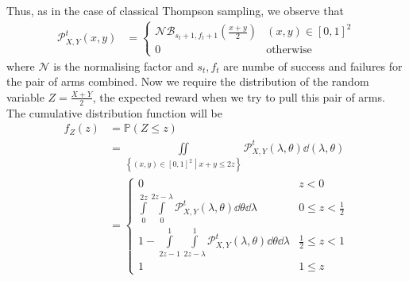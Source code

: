 Thus, as in the case of classical Thompson sampling, we observe that
\begin{align*}
    \mathcal{P}_{X,Y}^t(x,y) &= \begin{cases}
        \mathcal{N}\mathcal{B}_{s_t+1,f_t+1}\left(\tfrac{x+y}{2}\right) & (x,y)\in[0,1]^2 \\
        0 & \text{otherwise}
    \end{cases}
\end{align*}
where $\mathcal{N}$ is the normalising factor and $s_t,f_t$ are numbe of success and failures for the pair of arms combined. Now we require the distribution of the random variable $Z=\tfrac{X+Y}{2}$, the expected reward when we try to pull this pair of arms. The cumulative distribution function will be
\begin{align*}
    f_Z(z) &= \mathbb{P}(Z \leq z) \\
    &= \iint\limits_{\left\{(x,y)\in[0,1]^2\middle|x+y\leq 2z\right\}}\mathcal{P}_{X,Y}^t(\lambda,\theta)\dd(\lambda,\theta) \\
    &= \begin{cases}
        0 & z < 0 \\
        \int\limits_0^{2z}\int\limits_0^{2z - \lambda}\mathcal{P}_{X,Y}^t(\lambda,\theta)\dd\theta\dd\lambda & 0 \leq z < \tfrac{1}{2} \\
        1 - \int\limits_{2z-1}^1\int\limits_{2z-\lambda}^1\mathcal{P}_{X,Y}^t(\lambda,\theta)\dd\theta\dd\lambda & \tfrac{1}{2} \leq z < 1 \\
    1 & 1 \leq z
    \end{cases}
\end{align*}

